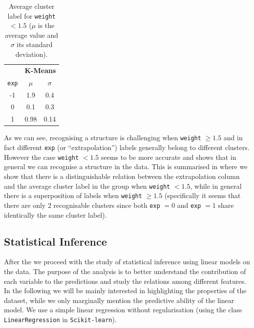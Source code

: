 \begin{table}[htbp]
  \centering
  \begin{tabular}{@{}ccc@{}}
  \toprule
               & \multicolumn{2}{c}{\textbf{K-Means}} \\
  \texttt{exp} & $\mu$             & $\sigma$        \\ \midrule
  -1           & 1.9               & 0.4             \\
  0            & 0.1               & 0.3             \\
  1            & 0.98              & 0.14            \\ \bottomrule
  \end{tabular}%
  \caption{Average cluster label for \texttt{weight} $< 1.5$ ($\mu$ is the average value and $\sigma$ its standard deviation).}
  \label{tab:lumps:kmeans}
\end{table}

As we can see, recognising a structure is challenging when \texttt{weight} $\ge 1.5$ and in fact different \texttt{exp} (or ``extrapolation'') labels generally belong to different clusters.
However the case \texttt{weight} $< 1.5$ seems to be more accurate and shows that in general we can recognise a structure in the data.
This is summarised in  where we show that there is a distinguishable relation between the extrapolation column and the average cluster label in the group
when \texttt{weight} $< 1.5$, while in general there is a superposition of
labels when \texttt{weight} $\ge 1.5$ (specifically it seems that there are only 2 recognisable clusters since both \texttt{exp} $= 0$ and \texttt{exp} $= 1$ share identically the same cluster label).


\subsection{Statistical Inference}

After the \eda we proceed with the study of statistical inference using linear models on the data.
The purpose of the analysis is to better understand the contribution of each variable to the predictions and study the relations among different features.
In the following we will be mainly interested in highlighting the properties of the dataset, while we only marginally mention the predictive ability of the linear model.
We use a simple linear regression without regularisation (using the class \texttt{LinearRegression} in \texttt{Scikit-learn}).

